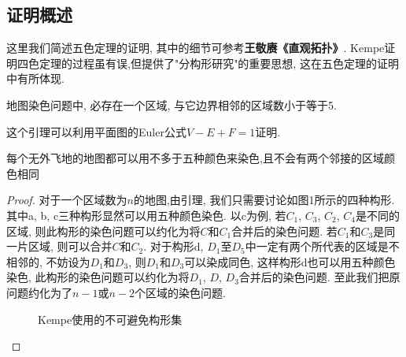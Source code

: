 \documentclass[main]{subfiles}
\begin{document}
\subsection*{证明概述}
这里我们简述五色定理的证明, 其中的细节可参考\textbf{王敬赓《直观拓扑》}. Kempe证明四色定理的过程虽有误,但提供了"分构形研究"的重要思想, 这在五色定理的证明中有所体现.
\begin{lemma}
	地图染色问题中, 必存在一个区域, 与它边界相邻的区域数小于等于5.
\end{lemma}
这个引理可以利用平面图的Euler公式$V-E+F=1$证明.
\begin{theorem}[五色定理]
	每个无外飞地的地图都可以用不多于五种颜色来染色,且不会有两个邻接的区域颜色相同
\end{theorem}
\begin{proof}
	对于一个区域数为$n$的地图,由引理, 我们只需要讨论如图1所示的四种构形. 其中a, b, c三种构形显然可以用五种颜色染色. 以c为例, 若$C_1$, $C_3$, $C_2$, $C_4$是不同的区域, 则此构形的染色问题可以约化为将$C$和$C_1$合并后的染色问题. 若$C_1$和$C_3$是同一片区域, 则可以合并$C$和$C_2$. 对于构形d, $D_1$至$D_5$中一定有两个所代表的区域是不相邻的, 不妨设为$D_1$和$D_3$, 则$D_1$和$D_3$可以染成同色, 这样构形d也可以用五种颜色染色, 此构形的染色问题可以约化为将$D_1$, $D$, $D_3$合并后的染色问题. 至此我们把原问题约化为了$n-1$或$n-2$个区域的染色问题.
	\begin{figure}[h]
		\centering
		\caption{Kempe使用的不可避免构形集}
		\label{fig:subfig_1}
	\end{figure}
\end{proof}
\end{document}
